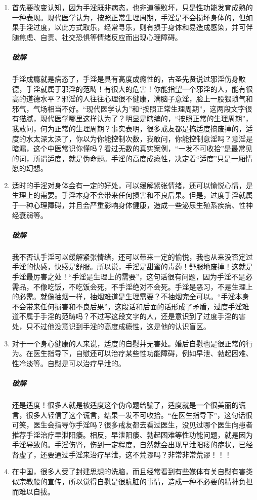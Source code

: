 \documentclass{ctexart}
\begin{document}
\begin{enumerate}
    \item 首先要改变认知，因为手淫既非病态，也非道德败坏，只是性功能发育成熟的一种表现。现代医学认为，按照正常生理周期，手淫是不会损坏身体的，但如果手淫过度，以此方式取乐，经常寻乐，则有损于身体和易造成感染，并可伴随焦虑、自责、社交恐惧等情绪反应而出现心理障碍。
    \subparagraph{破解} 手淫成瘾就是病态了，手淫是具有高度成瘾性的，古圣先贤说过邪淫伤身败德，手淫就属于邪淫的范畴！有很大的危害！你能指望一个邪淫的人，能有很高的道德水平？邪淫的人往往心理很不健康，满脑子意淫，脸上一股猥琐气和邪气，气场相当不好。“现代医学认为”和“按照正常生理周期”，这两段文字很有猫腻，现代医学哪里这样认为了？明显是瞎编的，“按照正常的生理周期”，我敢问，何为正常的生理周期？事实表明，很多戒友都是搞适度搞废掉的，适度的水太深太深了，你以为你能控制次数，我敢问，你能控制意淫吗？意淫是暗漏，这个中医常识你懂吗？看过无数的真实案例，“一发不可收拾”是最常见的词，所谓适度，就是伪命题。手淫的高度成瘾性，决定着“适度”只是一厢情愿的幻想。
    \item 适时的手淫对身体会有一定的好处，可以缓解紧张情绪，还可以愉悦心情，是生理上的需要。手淫本身不会带来任何损害和不良后果。但是，过度手淫就属于一种心理障碍，并且会严重影响身体健康，造成一些泌尿生殖系疾病、性神经衰弱等。
    \subparagraph{破解} 我不否认手淫可以缓解紧张情绪，还可以带来一定的愉悦，我也从来没否定过手淫的快感，快感是舒服。所以说，手淫是甜蜜的毒药！舒服地废掉！这就是手淫最厉害之处！“手淫是生理上的需要”，这句话很有问题，因为手淫不是必需品，不像吃饭，不吃饭会死，不手淫绝对不会死。手淫是恶习，不是生理上的必需。就像抽烟一样，抽烟难道是生理需要？不抽烟完全可以。“手淫本身不会带来任何损害和不良后果”，这段话和后面的话形成了矛盾，过度手淫难道不属于手淫的范畴吗？不过写这段文字的人，还是意识到了过度手淫的害处，只不过他没意识到手淫的高度成瘾性，这是他的认识盲区。
    \item 对于一个身心健康的人来说，适度的自慰并无害处。婚后自慰也是很正常的行为。在医生指导下，自慰还可以治疗某些性功能障碍，例如早泄、勃起困难、性冷淡等。自慰是可以治疗早泄的。
    \subparagraph{破解} 还是适度！很多人就是被适度这个伪命题给骗了，适度就是一个很美丽的谎言，很多人轻信了这个谎言，结果一发不可收拾。“在医生指导下”，这句话很可笑，医生会指导你手淫吗？很多戒友都去看过医生，没见过哪个医生向患者推荐手淫治疗早泄阳痿。相反，早泄阳痿、勃起困难等性功能问题，就是因为手淫导致的。手淫伤肾，伤到一定程度，自然就会出现早泄阳痿的症状，已经肾虚了，还要通过手淫来治疗早泄，这不荒谬吗？非常非常荒谬！！！
    \item 在中国，很多人受了封建思想的洗脑，而且经常看到有些媒体有关自慰有害类似宗教般的宣传，所以觉得自慰是很肮脏的事情，造成一种不必要的精神负担而难以自拔。

\end{enumerate}
\end{document}
